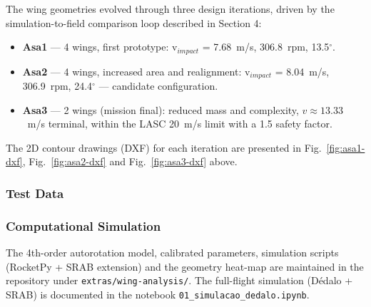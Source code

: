 The wing geometries evolved through three design iterations, driven
by the simulation-to-field comparison loop described in Section 4:

\begin{itemize}
\item \textbf{Asa1} — 4 wings, first prototype: v$_{impact}$ =
  7.68~m/s, 306.8~rpm, 13.5$^{\circ}$.
\item \textbf{Asa2} — 4 wings, increased area and realignment:
  v$_{impact}$ = 8.04~m/s, 306.9~rpm, 24.4$^{\circ}$ — candidate
  configuration.
\item \textbf{Asa3} — 2 wings (mission final): reduced mass and
  complexity, $v \approx 13.33$~m/s terminal, within the LASC
  20~m/s limit with a 1.5 safety factor.
\end{itemize}

The 2D contour drawings (DXF) for each iteration are presented in
Fig.~\ref{fig:asa1-dxf}, Fig.~\ref{fig:asa2-dxf} and
Fig.~\ref{fig:asa3-dxf} above.

\subsubsection{Test Data}


\subsubsection{Computational Simulation}

The 4th-order autorotation model, calibrated parameters, simulation
scripts (RocketPy + SRAB extension) and the geometry heat-map are
maintained in the repository under \texttt{extras/wing-analysis/}.
The full-flight simulation (Dédalo + SRAB) is documented in the
notebook \texttt{01\_simulacao\_dedalo.ipynb}.
